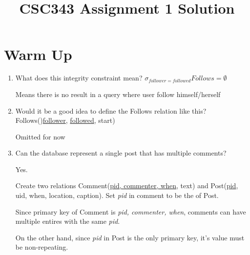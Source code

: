 \documentclass[12pt]{article}
\begin{document}
\title{CSC343 Assignment 1 Solution}
\maketitle

\section*{Warm Up}

\begin{enumerate}[1.]
    \item What does this integrity constraint mean? $\sigma_{follower=followed}Follows = \emptyset$

    \bigskip

    \begin{mdframed}
    Means there is no result in a query where user follow himself/herself
    \end{mdframed}

    \item Would it be a good idea to define the Follows relation like this? Follows()\underline{follower}, \underline{followed}, start)

    \bigskip

    \begin{mdframed}
    Omitted for now
    \end{mdframed}

    \item Can the database represent a single post that has multiple comments?

    \bigskip

    \begin{mdframed}
        Yes.

        \bigskip

        Create two relations Comment(\underline{pid, commenter, when}, text) and
        Post(\underline{pid}, uid, when, location, caption). Set \textit{pid} in
        comment to be the  of Post.

        \bigskip

        Since primary key of Comment is \textit{pid, commenter, when}, comments
        can have multiple entires with the same \textit{pid}.

        \bigskip

        On the other hand, since \textit{pid} in Post is the only primary key,
        it's value must be non-repeating.
    \end{mdframed}


\end{enumerate}
\end{document}
